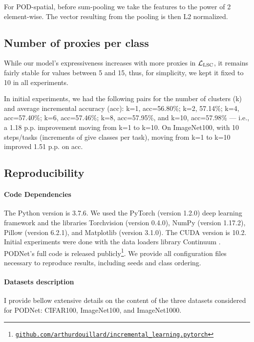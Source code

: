 For POD-spatial, before sum-pooling we take the features to the power of 2 element-wise. The vector
resulting from the pooling is then L2 normalized.

\subsection{Number of proxies per class}

While our model's expressiveness increases with more proxies in $\mathcal{L}_\text{LSC}$, it remains fairly
stable for values between 5 and 15, thus, for simplicity, we kept it fixed to 10 in all experiments.

In initial experiments, we had the following pairs for the number of clusters (k) and average
incremental accuracy (acc): k=1, acc=56.80\%; k=2, 57.14\%; k=4, acc=57.40\%; k=6, acc=57.46\%; k=8,
acc=57.95\%, and k=10, acc=57.98\% --- i.e., a 1.18 p.p. improvement moving from k=1 to k=10. On
ImageNet100, with 10 steps/tasks (increments of give classes per task), moving from k=1 to k=10
improved 1.51 p.p. on acc.

\subsection{Reproducibility}
\label{sec:appendix_podnet_repro}

\paragraph{Code Dependencies} The Python version is 3.7.6. We used the PyTorch
\citep{paszke2017pytorch} (version 1.2.0) deep learning framework and the libraries Torchvision
(version 0.4.0), NumPy \citep{oliphant2006numpy} (version 1.17.2), Pillow (version 6.2.1), and
Matplotlib \citep{hunter2007matplotlib} (version 3.1.0). The CUDA version is 10.2. Initial
experiments were done with the data loaders library Continuum \citep{douillardlesort2021continuum}.
PODNet's full code is released
publicly\footnote{\href{https://github.com/arthurdouillard/incremental\_learning.pytorch}{\texttt{github.com/arthurdouillard/incremental\_learning.pytorch}}}.
We provide all configuration files necessary to reproduce results, including seeds and class
ordering.

\paragraph{Datasets description} I provide bellow extensive details on the content of the three
datasets considered for PODNet: CIFAR100, ImageNet100, and ImageNet1000.

